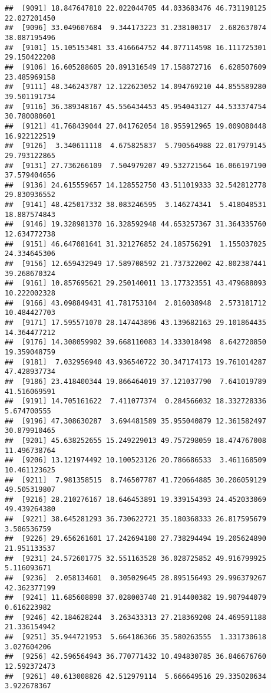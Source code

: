 \documentclass[
]{article}
\begin{document}
\begin{verbatim}
##  [9091] 18.847647810 22.022044705 44.033683476 46.731198125 22.027201450
##  [9096] 33.049607684  9.344173223 31.238100317  2.682637074 38.087195496
##  [9101] 15.105153481 33.416664752 44.077114598 16.111725301 29.150422208
##  [9106] 16.605288605 20.891316549 17.158872716  6.628507609 23.485969158
##  [9111] 48.346243787 12.122623052 14.094769210 44.855589280 39.501191734
##  [9116] 36.389348167 45.556434453 45.954043127 44.533374754 30.780080601
##  [9121] 41.768439044 27.041762054 18.955912965 19.009080448 16.922122519
##  [9126]  3.340611118  4.675825837  5.790564988 22.017979145 29.793122865
##  [9131] 27.736266109  7.504979207 49.532721564 16.066197190 37.579404656
##  [9136] 24.615559657 14.128552750 43.511019333 32.542812778 29.830936552
##  [9141] 48.425017332 38.083246595  3.146274341  5.418048531 18.887574843
##  [9146] 19.328981370 16.328592948 44.653257367 31.364335760 12.634772738
##  [9151] 46.647081641 31.321276852 24.185756291  1.155037025 24.334645306
##  [9156] 12.659432949 17.589708592 21.737322002 42.802387441 39.268670324
##  [9161] 10.857695621 29.250140011 13.177323551 43.479688093 10.222002328
##  [9166] 43.098849431 41.781753104  2.016038948  2.573181712 10.484427703
##  [9171] 17.595571070 28.147443896 43.139682163 29.101864435 14.364477212
##  [9176] 14.308059902 39.668110083 14.333018498  8.642720850 19.359048759
##  [9181]  7.032956940 43.936540722 30.347174173 19.761014287 47.428937734
##  [9186] 23.418400344 19.866464019 37.121037790  7.641019789 41.516069591
##  [9191] 14.705161622  7.411077374  0.284566032 18.332728336  5.674700555
##  [9196] 47.308630287  3.694481589 35.955040879 12.361582497 30.879910465
##  [9201] 45.638252655 15.249229013 49.757298059 18.474767008 11.496738764
##  [9206] 13.121974492 10.100523126 20.786686533  3.461168509 10.461123625
##  [9211]  7.981358515  8.746507787 41.720664885 30.206059129 49.505319807
##  [9216] 28.210276167 18.646453891 19.339154393 24.452033069 49.439264380
##  [9221] 38.645281293 36.730622721 35.180368333 26.817595679  3.506536759
##  [9226] 29.656261601 17.242694180 27.738294494 19.205624890 21.951133537
##  [9231] 24.572601775 32.551163528 36.028725852 49.916799925  5.116093671
##  [9236]  2.058134601  0.305029645 28.895156493 29.996379267 42.362377199
##  [9241] 11.685608898 37.028003740 21.914400382 19.907944079  0.616223982
##  [9246] 42.184628244  3.263433313 27.218369208 24.469591188 21.336154942
##  [9251] 35.944721953  5.664186366 35.580263555  1.331730618  3.027604206
##  [9256] 42.596564943 36.770771432 10.494830785 36.846676760 12.592372473
##  [9261] 40.613008826 42.512979114  5.666649516 29.335020634  3.922678367

\end{verbatim}
\end{document}
